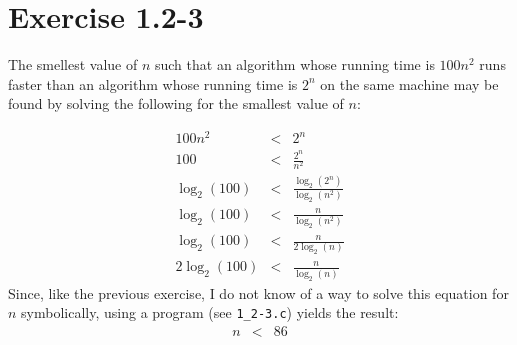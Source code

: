 \documentclass{article}
\begin{document}
\section*{Exercise 1.2-3}

The smellest value of $n$ such that an algorithm whose running time is $100n^2$ runs faster than an algorithm whose running time is $2^n$ on the same machine may be found by solving the following for the smallest value of $n$:

\begin{eqnarray*}
	100n^2 & < & 2^n \\
	100 & < & \frac{2^n}{n^2} \\
	\log_2(100) & < & \frac{\log_2(2^n)}{\log_2(n^2)} \\
	\log_2(100) & < & \frac{n}{\log_2(n^2)} \\
	\log_2(100) & < & \frac{n}{2\log_2(n)} \\
	2\log_2(100) & < & \frac{n}{\log_2(n)}
\end{eqnarray*}
Since, like the previous exercise, I do not know of a way to solve this equation for $n$ symbolically, using a program (see \texttt{1\_2-3.c}) yields the result:
\begin{eqnarray*}
	n & < & 86
\end{eqnarray*}
\end{document}
